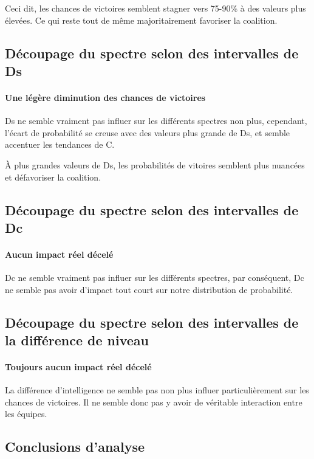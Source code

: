 Ceci dit, les chances de victoires semblent stagner vers 75-90\% à des valeurs plus élevées. Ce qui reste tout de même majoritairement favoriser la coalition.



\subsection{Découpage du spectre selon des intervalles de Ds}
\paragraph{Une légère diminution des chances de victoires}
Ds ne semble vraiment pas influer sur les différents spectres non plus, cependant, l'écart de probabilité se creuse avec des valeurs plus grande de Ds, et semble accentuer les tendances de C.

À plus grandes valeurs de Ds, les probabilités de vitoires semblent plus nuancées et défavoriser la coalition.


\subsection{Découpage du spectre selon des intervalles de Dc}
\paragraph{Aucun impact réel décelé}
Dc ne semble vraiment pas influer sur les différents spectres, par conséquent, Dc ne semble pas avoir d'impact tout court sur notre distribution de probabilité.



\subsection{Découpage du spectre selon des intervalles de la différence de niveau}
\paragraph{Toujours aucun impact réel décelé}
La différence d'intelligence ne semble pas non plus influer particulièrement sur les chances de victoires. Il ne semble donc pas y avoir de véritable interaction entre les équipes.



\subsection{Conclusions d'analyse}


